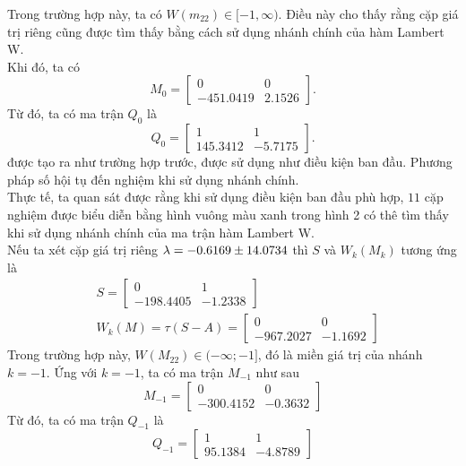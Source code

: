 Trong trường hợp này, ta có $W(m_{22}) \in [-1, \infty)$. Điều này cho thấy rằng cặp giá trị riêng cũng được tìm thấy bằng cách sử dụng nhánh chính của hàm Lambert W. \\
Khi đó, ta có 
\begin{equation*}
	M_0= \begin{bmatrix}
		0&0\\ -451.0419 &2.1526
	\end{bmatrix}.
\end{equation*}
Từ đó, ta có ma trận $Q_0$ là
\begin{equation}\label{eq39}
	Q_0= \begin{bmatrix}
		1&1\\ 145.3412 &-5.7175
	\end{bmatrix}.
\end{equation}
được tạo ra như trường hợp trước, được sử dụng như điều kiện ban đầu. Phương pháp số hội tụ đến nghiệm khi sử dụng nhánh chính.\\
Thực tế, ta quan sát được rằng khi sử dụng điều kiện ban đầu phù hợp, $11$ cặp nghiệm được biểu diễn bằng hình vuông màu xanh trong hình 2 có thê tìm thấy khi sử dụng nhánh chính của ma trận hàm Lambert W.\\
Nếu ta xét cặp giá trị riêng $\lambda = -0.6169 \pm 14.0734$ thì $S$ và $W_k(M_k)$ tương ứng là
\begin{align}\label{eq40}
	&S=\begin{bmatrix}
		0 & 1 \\ -198.4405 & -1.2338
	\end{bmatrix}
	\\ 
	& W_k(M)= \tau (S -A)=\begin{bmatrix}
		0 & 0 \\ -967.2027 & -1.1692
	\end{bmatrix}
\end{align} 
Trong trường hợp này, $W(M_{22}) \in (-\infty; -1]$, đó là miền giá trị của nhánh $k = -1$. Ứng với $k = -1$, ta có ma trận $M_{-1}$ như sau
\begin{equation*}
	M_{-1}= \begin{bmatrix}
		0 & 0 \\   -300.4152  &-0.3632
	\end{bmatrix}
\end{equation*}
Từ đó, ta có ma trận $Q_{-1}$ là
\begin{equation}\label{eq41}
	Q_{-1}	= \begin{bmatrix}
		1&1\\95.1384 & -4.8789
	\end{bmatrix}
\end{equation}

